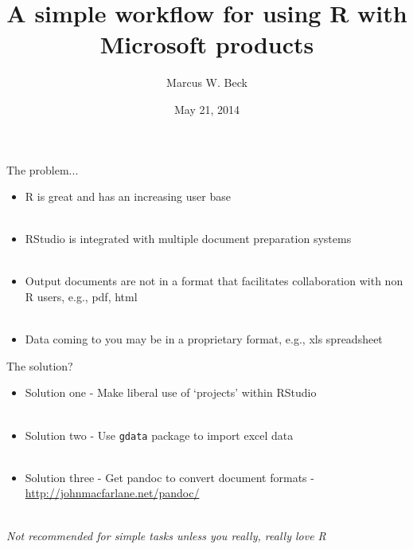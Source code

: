 \documentclass[xcolor=svgnames]{beamer}\usepackage{graphicx, color}
\begin{document}
\title[R with Microsoft]{A simple workflow for using R with Microsoft products}
\author[M. Beck]{Marcus W. Beck}


\date{May 21, 2014}

\begin{frame}
\vspace{-0.3in}
\titlepage
\end{frame}

\begin{frame}{The problem...}
\begin{itemize}
\item R is great and has an increasing user base\\~\\
\item RStudio is integrated with multiple document preparation systems \\~\\
\item Output documents are not in a format that facilitates collaboration with 
non R users, e.g., pdf, html \\~\\
\item Data coming to you may be in a proprietary format, e.g., xls spreadsheet
\end{itemize}
\end{frame}

\begin{frame}{The solution?}
\begin{itemize}
\item Solution one - Make liberal use of `projects' within RStudio \\~\\
\item Solution two - Use \texttt{gdata} package to import excel data \\~\\
\item Solution three - Get pandoc to convert document formats - \href{http://johnmacfarlane.net/pandoc/}{http://johnmacfarlane.net/pandoc/} \\~\\
\end{itemize}
\large
\centerline{\textit{Not recommended for simple tasks unless you really, really love R}}
\end{frame}
\end{document}
